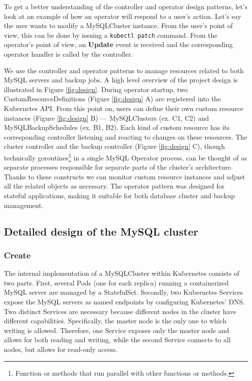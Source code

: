 To get a better understanding of the controller and operator design patterns, let’s look at an
example of how an operator will respond to a user’s action. Let’s say the user wants to modify a
MySQLCluster instance. From the user’s point of view, this can be done by issuing a
\texttt{kubectl patch} command. From the operator’s point of view, an \textbf{Update} event is
received and the corresponding operator handler is called by the controller.

We use the controller and operator patterns to manage resources related to both 
MySQL servers and backup jobs. A high level overview of the project design is
illustrated in Figure \ref{fig:design}. During operator startup, two
CustomResourceDefinitions (Figure \ref{fig:design} A) are registered into the Kubernetes API.
From this point on, users can define their own custom resource instances (Figure \ref{fig:design} B) ---
MySQLClusters (ex. C1, C2) and MySQLBackupSchedules (ex. B1, B2). Each kind of
custom resource has its corresponding controller listening and reacting to changes on these
resources. The cluster controller and the backup controller (Figure \ref{fig:design} C), though technically
goroutines\footnote{Function or methods that run parallel with other functions or methods.} in a single
MySQL Operator process, can be thought of as separate processes responsible for separate parts of the
cluster’s architecture. Thanks to these constructs we can monitor custom resource instances and adjust
all the related objects as necessary. The operator pattern was designed for stateful applications, making
it suitable for both database cluster and backup management.~\cite{coreos}

\subsection{Detailed design of the MySQL cluster}

\subsubsection*{Create}
The internal implementation of a MySQLCluster within Kubernetes consists of two parts. First,
several Pods (one for each replica) running a containerized MySQL server are managed by a
StatefulSet. Secondly, two Kubernetes Services expose the MySQL servers as named endpoints by
configuring Kubernetes’ DNS. Two distinct Services are necessary because different nodes in the
cluster have different capabilities. Specifically, the master node is the only one to which writing
is allowed. Therefore, one Service exposes only the  master node and allows for both reading and
writing, while the second Service connects to all nodes, but allows for read-only access. 

